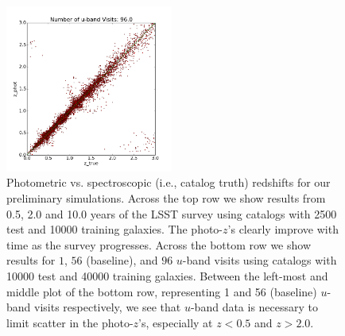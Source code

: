 \begin{figure}[h]
\begin{center}
\includegraphics[width=5.5cm]{figs/photoz/uvisits_cat6.png}
\caption{Photometric vs. spectroscopic (i.e., catalog truth) redshifts
for our preliminary simulations. Across the top row we show results from
0.5, 2.0 and 10.0 years of the LSST survey using catalogs with 2500 test
and 10000 training galaxies. The photo-$z$'s clearly improve with time
as the survey progresses. Across the bottom row we show results for $1$,
$56$ (baseline), and $96$ $u$-band visits using catalogs with 10000 test
and 40000 training galaxies. Between the left-most and middle plot of
the bottom row, representing 1 and 56 (baseline) $u$-band visits
respectively, we see that $u$-band data is necessary to limit scatter in
the photo-$z$'s, especially at $z<0.5$ and $z>2.0$.
\label{fig:redshifts}}
\end{center}
\end{figure}

